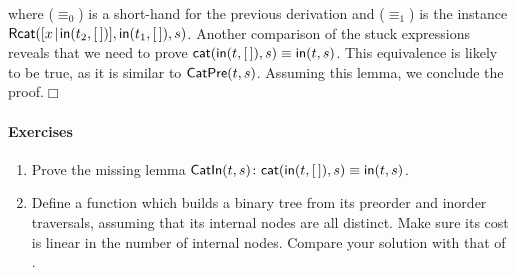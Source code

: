 where (\(\equiv_0\)) is a short\hyp{}hand for the previous derivation
and (\(\equiv_1\)) is the instance
\(\textsf{Rcat}({[{x}\!\mid\!{\textsf{in}(t_2,[\,])}], \textsf{in}(t_1,[\,]),
  s})\). Another comparison of the stuck expressions reveals that we
need to prove \(\textsf{cat}(\textsf{in}(t,[\,]),s) \equiv
\textsf{in}(t,s)\). This equivalence is likely to be true, as it is
similar to \(\textsf{CatPre}({t,s})\).
Assuming this lemma, we conclude the proof.\hfill\(\Box\)

\paragraph{Exercises}
\begin{enumerate}

  \item Prove the missing lemma \(\textsf{CatIn}({t,s}) \colon
  \textsf{cat}(\textsf{in}(t,[\,]),s) \equiv
  \textsf{in}(t,s)\).

  \item Define a function which builds a binary tree from its preorder
    and inorder traversals, assuming that its internal nodes are all
    distinct. Make sure its cost is linear in the number of internal
    nodes. Compare your solution with that of \cite{MuBird_2003}.

\end{enumerate}


